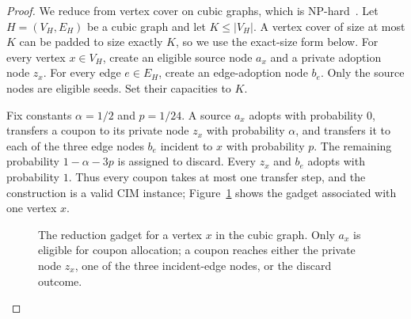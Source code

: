 \documentclass[sigconf,balance=false]{acmart}
\begin{document}
\begin{proof}
We reduce from vertex cover on cubic graphs, which is
NP-hard~\cite{garey1976simplified}.
Let $H=(V_H,E_H)$ be a cubic graph and let $K\leq |V_H|$.
A vertex cover of size at most $K$ can be padded to size exactly $K$, so
we use the exact-size form below.
For every vertex $x\in V_H$, create an eligible source node $a_x$ and a
private adoption node $z_x$.
For every edge $e\in E_H$, create an edge-adoption node $b_e$.
Only the source nodes are eligible seeds.
Set their capacities to $K$.

Fix constants $\alpha=1/2$ and $p=1/24$.
A source $a_x$ adopts with probability $0$, transfers a coupon to its
private node $z_x$ with probability $\alpha$, and transfers it to each
of the three edge nodes $b_e$ incident to $x$ with probability $p$.
The remaining probability $1-\alpha-3p$ is assigned to discard.
Every $z_x$ and $b_e$ adopts with probability $1$.
Thus every coupon takes at most one transfer step, and the construction
is a valid CIM instance; Figure~\ref{fig:hardness-gadget} shows the
gadget associated with one vertex $x$.

\begin{figure}[t]
  \centering
  \caption{The reduction gadget for a vertex $x$ in the cubic graph.
  Only $a_x$ is eligible for coupon allocation; a coupon reaches either
  the private node $z_x$, one of the three incident-edge nodes, or the
  discard outcome.}
  \label{fig:hardness-gadget}
\end{figure}


\end{proof}
\end{document}
